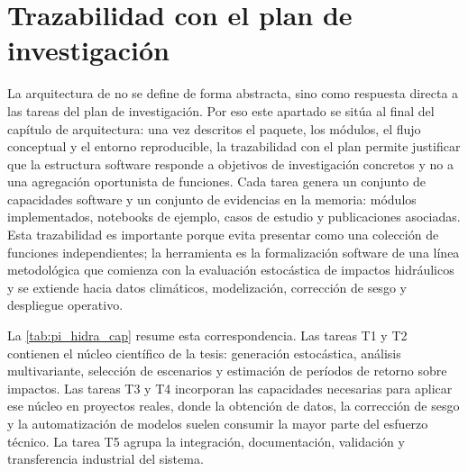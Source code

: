 \section{Trazabilidad con el plan de investigación}

La arquitectura de \hydra no se define de forma abstracta, sino como respuesta directa a las tareas del plan de investigación. Por eso este apartado se sitúa al final del capítulo de arquitectura: una vez descritos el paquete, los módulos, el flujo conceptual y el entorno reproducible, la trazabilidad con el plan permite justificar que la estructura software responde a objetivos de investigación concretos y no a una agregación oportunista de funciones. Cada tarea genera un conjunto de capacidades software y un conjunto de evidencias en la memoria: módulos implementados, notebooks de ejemplo, casos de estudio y publicaciones asociadas. Esta trazabilidad es importante porque evita presentar \hydra como una colección de funciones independientes; la herramienta es la formalización software de una línea metodológica que comienza con la evaluación estocástica de impactos hidráulicos y se extiende hacia datos climáticos, modelización, corrección de sesgo y despliegue operativo.

La \cref{tab:pi_hidra_cap} resume esta correspondencia. Las tareas T1 y T2 contienen el núcleo científico de la tesis: generación estocástica, análisis multivariante, selección de escenarios y estimación de períodos de retorno sobre impactos. Las tareas T3 y T4 incorporan las capacidades necesarias para aplicar ese núcleo en proyectos reales, donde la obtención de datos, la corrección de sesgo y la automatización de modelos suelen consumir la mayor parte del esfuerzo técnico. La tarea T5 agrupa la integración, documentación, validación y transferencia industrial del sistema.

